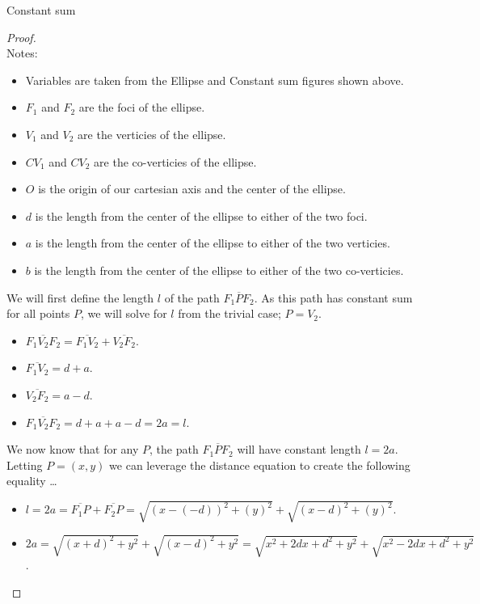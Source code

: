 \documentclass[12pt]{article}
\newcommand{\ds}{\displaystyle}
\theoremstyle{plain}
\begin{document}
\begin{center}
  Constant sum
\end{center}

\begin{proof}
  \ \\

  Notes: 
  \begin{itemize}
    \item Variables are taken from the Ellipse and Constant sum figures shown above.
    \item $ F_{1} $ and $ F_{2} $ are the foci of the ellipse.
    \item $ V_{1} $ and $ V_{2} $ are the verticies of the ellipse.
    \item $ CV_{1} $ and $ CV_{2} $ are the co-verticies of the ellipse.
    \item $ O $ is the origin of our cartesian axis and the center of the ellipse.
    \item $ d $ is the length from the center of the ellipse to either of the two foci.
    \item $ a $ is the length from the center of the ellipse to either of the two verticies.
    \item $ b $ is the length from the center of the ellipse to either of the two co-verticies.
  \end{itemize}

  We will first define the length $ l $ of the path $ \overline{F_{1}PF_{2}} $.
  As this path has constant sum for all points $ P $, we will solve for $ l $ from the trivial case; $ P = V_{2} $.
  \begin{itemize}
    \item $ \overline{F_{1}V_{2}F_{2}} = \overline{F_{1}V_{2}} + \overline{V_{2}F_{2}} $.
    \item $ \overline{F_{1}V_{2}} = d + a $.
    \item $ \overline{V_{2}F_{2}} = a - d $.
    \item $ \overline{F_{1}V_{2}F_{2}} = d + a + a - d = 2a = l $.
  \end{itemize}

  We now know that for any $ P $, the path $ \overline{F_{1}PF_{2}} $ will have constant length $ l = 2a $.
  Letting $ P = (x,y) $ we can leverage the distance equation to create the following equality \dots
  
  \begin{itemize}
    \item $ \ds l = 2a = \overline{F_{1}P} + \overline{F_{2}P} = \sqrt{(x - (-d))^{2} + (y)^{2}} + \sqrt{(x - d)^{2} + (y)^{2}} $.
    \item $ \ds 2a = \sqrt{(x + d)^{2} + y^{2}} + \sqrt{(x - d)^{2} + y^{2}} = \sqrt{x^{2} + 2dx + d^{2} + y^{2}} + \sqrt{x^{2} - 2dx + d^{2} + y^{2}} $.
  \end{itemize}
  

\end{proof}
\end{document}
